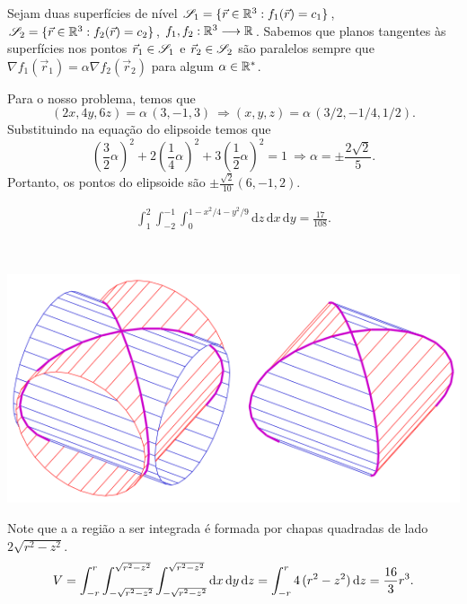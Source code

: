 \begin{questions}
\begin{solution}
    Sejam duas superfícies de nível $\cal{S}_1 = \{\vec r\in \R^3 : f_1(\vec r) = c_1 \}$, $\cal{S}_2 = \{\vec r \in \R^3 : f_2(\vec r) = c_2 \}$, $f_1,f_2: \R^3 \longrightarrow \R$.
    Sabemos que planos tangentes às superfícies nos pontos $\vec r_1\in\cal{S}_1$ e $\vec r_2 \in \cal{S}_2$ são paralelos sempre que
    $
        \nabla f_1(\vec r_1) = \alpha \nabla f_2(\vec r_2)
    $
    para algum $\alpha\in\R^*$.
    
    Para o nosso problema, temos que
    \[
        (2x, 4y, 6z) = \alpha\,(3,-1,3)
            ~ \Rightarrow (x,y,z) = \alpha\,(3/2,-1/4,1/2).
    \]
    Substituindo na equação do elipsoide temos que
    \[
        \left( \frac{3}{2} \alpha \right)^2+2\left( \frac{1}{4} \alpha\right)^2+3\left( \frac{1}{2} \alpha\right)^2 = 1
            ~ \Rightarrow \alpha = \pm\frac{2\sqrt{2}}{5}.
    \]
    Portanto, os pontos do elipsoide são $\pm\frac{\sqrt{2}}{10}\left(6,-1,2\right)$.
\end{solution}

\setcounter{question}{8}

\begin{solution}
    \begin{align*}
        \int_{1}^{2} \int_{-2}^{-1} \int_{0}^{1-x^2/4-y^2/9} \mathrm{d}z\,\mathrm{d}x\,\mathrm{d}y = \frac{17}{108}.
    \end{align*}
\end{solution}


\begin{solution}
    ~
    \begin{center}
        \includegraphics[width=0.5\paperwidth]{ex_3-10.png}
    \end{center}
    Note que a a região a ser integrada é formada por chapas quadradas de lado $2\sqrt{r^2-z^2}$.
    \begin{align*}
        V = \int_{-r}^r \int_{-\sqrt{r^2-z^2}}^{\sqrt{r^2-z^2}} \int_{-\sqrt{r^2-z^2}}^{\sqrt{r^2-z^2}} \diff x\,\diff y\,\diff z
            = \int_{-r}^r 4\,(r^2-z^2)\,\diff z
            = \frac{16}{3} r^3.
    \end{align*}
    

\end{solution}
\end{questions}
